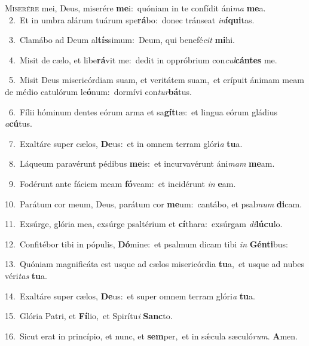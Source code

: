 \lettrine{\initial\textcolor{\initialcolor}{M}}{iserére} mei, Deus, miserére \textbf{me}\-i:~\star quóniam in te confídit áni\textit{ma} \textbf{me}\-a.\\
{\numbfont\textcolor{\numbcolor}{~2.}}~Et in umbra alárum tuárum spe\-\textbf{rá}\-bo:~\star donec tránseat \textit{in}\-\textbf{í}\textbf{qui}tas.\par
{\numbfont\textcolor{\numbcolor}{~3.}}~Clamábo ad Deum al\-\textbf{tís}\-simum:~\star Deum, qui benefé\textit{cit} \textbf{mi}\-hi.\par
{\numbfont\textcolor{\numbcolor}{~4.}}~Misit de cælo, et libe\-\textbf{rá}\-vit me:~\star dedit in oppróbrium con\-\textit{cul}\-\textbf{cán}\textbf{tes} me.\par
{\numbfont\textcolor{\numbcolor}{~5.}}~Misit Deus misericórdiam suam, et veritátem suam,~\dagger et erípuit ánimam meam de médio catulórum le\-\textbf{ó}\-num:~\star dormívi con\-\textit{tur}\-\textbf{bá}tus.\par
{\numbfont\textcolor{\numbcolor}{~6.}}~Fílii hóminum dentes eórum arma et sa\-\textbf{gít}\-tæ:~\star et lingua eórum gládius \textit{a}\-\textbf{cú}tus.\par
{\numbfont\textcolor{\numbcolor}{~7.}}~Exaltáre super cælos, \textbf{De}\-us:~\star et in omnem terram glóri\textit{a} \textbf{tu}\-a.\par
{\numbfont\textcolor{\numbcolor}{~8.}}~Láqueum paravérunt pédibus \textbf{me}\-is:~\star et incurvavérunt áni\textit{mam} \textbf{me}\-am.\par
{\numbfont\textcolor{\numbcolor}{~9.}}~Fodérunt ante fáciem meam \textbf{fó}\-veam:~\star et incidérunt \textit{in} \textbf{e}\-am.\par
{\numbfont\textcolor{\numbcolor}{10.}}~Parátum cor meum, Deus, parátum cor \textbf{me}\-um:~\star cantábo, et psal\textit{mum} \textbf{di}\-cam.\par
{\numbfont\textcolor{\numbcolor}{11.}}~Exsúrge, glória mea, exsúrge psaltérium et \textbf{cí}\-thara:~\star exsúrgam \textit{di}\-\textbf{lú}\textbf{cu}lo.\par
{\numbfont\textcolor{\numbcolor}{12.}}~Confitébor tibi in pópulis, \textbf{Dó}\-mine:~\star et psalmum dicam tibi \textit{in} \textbf{Gén}\-\textbf{ti}bus:\par
{\numbfont\textcolor{\numbcolor}{13.}}~Quóniam magnificáta est usque ad cælos misericórdia \textbf{tu}\-a,~\star et usque ad nubes véri\textit{tas} \textbf{tu}\-a.\par
{\numbfont\textcolor{\numbcolor}{14.}}~Exaltáre super cælos, \textbf{De}\-us:~\star et super omnem terram glóri\textit{a} \textbf{tu}\-a.\par
{\numbfont\textcolor{\numbcolor}{15.}}~Glória Patri, et \textbf{Fí}\-lio,~\star et Spirítu\textit{i} \textbf{Sanc}\-to.\par
{\numbfont\textcolor{\numbcolor}{16.}}~Sicut erat in princípio, et nunc, et \textbf{sem}\-per,~\star et in sǽcula sæculó\-\textit{rum}\-. \textbf{A}\-men.\par
